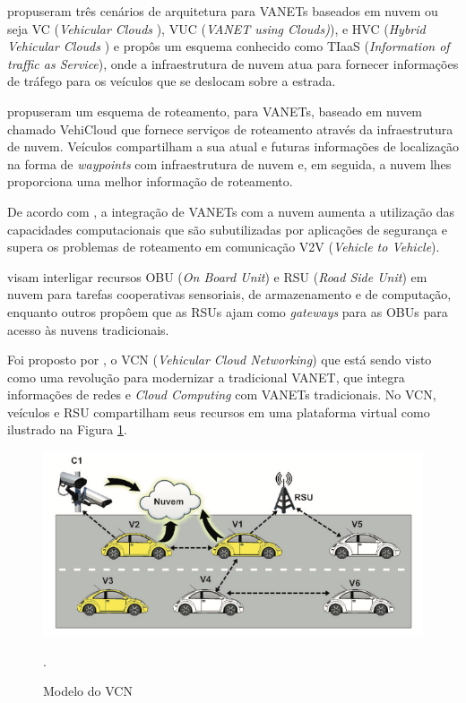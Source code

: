 \documentclass[
	12pt,				%
	oneside,			%
	a4paper,			%
	english,			%
	brazil				%
	]{abntex2ppgsi}
\begin{document}
  propuseram três cenários de arquitetura para VANETs baseados em nuvem ou seja VC (\textit{Vehicular Clouds }), VUC (\textit{VANET using Clouds)}), e HVC (\textit{Hybrid Vehicular Clouds }) e propôs um esquema conhecido como TIaaS (\textit{Information of traffic as Service}), onde a infraestrutura de nuvem atua para fornecer informações de tráfego para os veículos que se deslocam sobre a estrada.

  propuseram um esquema de roteamento, para VANETs, baseado em nuvem chamado VehiCloud que fornece serviços de roteamento através da infraestrutura de nuvem. Veículos compartilham a sua atual e futuras informações de localização na forma de \textit{waypoints} com infraestrutura de nuvem e, em seguida, a nuvem lhes proporciona uma melhor informação de roteamento.

De acordo com , a integração de VANETs com a nuvem aumenta a utilização das capacidades computacionais que são subutilizadas por aplicações de segurança e supera os problemas de roteamento em comunicação V2V (\textit{Vehicle to Vehicle}).

 visam interligar recursos OBU (\textit{On Board Unit}) e RSU (\textit{Road Side Unit}) em nuvem para tarefas cooperativas sensoriais, de armazenamento e de computação, enquanto outros \cite{hussain2012rethinking} \cite{mershad2013finding} propôem que as RSUs ajam como \textit{gateways} para as OBUs para acesso às nuvens tradicionais.

Foi proposto por , o VCN (\textit{Vehicular Cloud Networking}) que está sendo visto como uma revolução para modernizar a tradicional VANET, que integra informações de redes e \textit{Cloud Computing} com VANETs tradicionais. No VCN, veículos e  RSU compartilham seus recursos em uma plataforma virtual como ilustrado na Figura \ref{fig:vcn}.

\begin{figure}[h!]
	\centering
	\includegraphics[width=0.7\columnwidth]{images/vcn.png}
	\caption{Modelo do VCN \cite{lee2014vehicular}}.
	\label{fig:vcn}
\end{figure}
\end{document}
